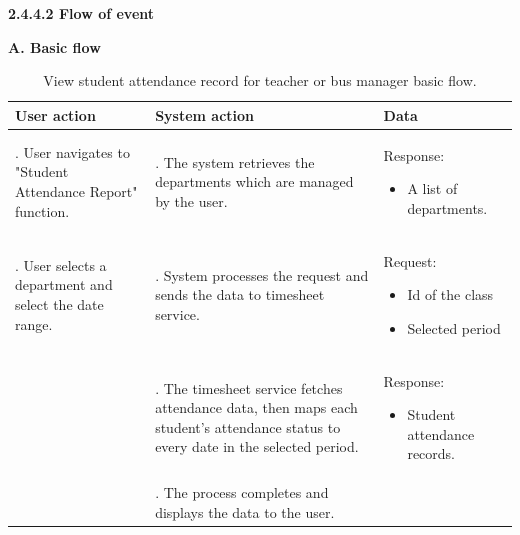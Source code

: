 \vspace{0.5em}
\indent\textbf{2.4.4.2 Flow of event}
\vspace{0.5em}
\par\indent\indent\textbf{A. Basic flow}
\vspace{-0.5em}
\renewcommand{\arraystretch}{1.5}
\begin{longtable}{|>{\raggedright\arraybackslash}p{4.5cm}|
                  >{\raggedright\arraybackslash}p{6cm}|
                  >{\raggedright\arraybackslash}p{4.5cm}|}                  
\caption{View student attendance record for teacher or bus manager basic flow.}
\label{tab:student_attendance_view_attendance_basic_flow}\\
\hline
\centering\textbf{User action} & \centering\textbf{System action} & \centering\arraybackslash\textbf{Data} \\
\hline
\endfirsthead
\endhead
1. User navigates to "Student Attendance Report" function. & 2. The system retrieves the
departments which are managed by the user.& 
    \par{Response: 
        \vspace{-0.8em}
        \begin{itemize}
            \item A list of departments.
            \vspace{-1.2em}
        \end{itemize}
    }\\
\hline
3. User selects a department and select the date range.&4. System processes the request and sends the data to timesheet service.&
\par{Request: 
        \vspace{-0.8em}
        \begin{itemize}
            \item Id of the class
            \vspace{-0.8em}
            \item Selected period
            \vspace{-1.5em}
        \end{itemize}
    }\\
\hline
&5. The timesheet service fetches attendance data, then maps each student's attendance status to every date in the selected period.&
\par{Response: 
        \vspace{-0.8em}
        \begin{itemize}
            \item Student attendance records.
            \vspace{-1.5em}
        \end{itemize}
    }\\
\hline
&6. The process completes and displays the data to the user.&\\
\hline
\end{longtable}
